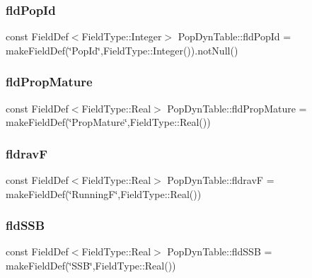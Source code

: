 \subsubsection{\texorpdfstring{fldPopId}{fldPopId}}
{\footnotesize\ttfamily const Field\+Def$<$Field\+Type\+::\+Integer$>$ Pop\+Dyn\+Table\+::fld\+Pop\+Id = make\+Field\+Def(\char`\"{}Pop\+Id\char`\"{},Field\+Type\+::\+Integer()).not\+Null()}

\mbox{\label{class_pop_dyn_table_a72338a05a2e3d98b7ee92238ddbfdc67}} 
\subsubsection{\texorpdfstring{fldPropMature}{fldPropMature}}
{\footnotesize\ttfamily const Field\+Def$<$Field\+Type\+::\+Real$>$ Pop\+Dyn\+Table\+::fld\+Prop\+Mature = make\+Field\+Def(\char`\"{}Prop\+Mature\char`\"{},Field\+Type\+::\+Real())}

\mbox{\label{class_pop_dyn_table_a75abd6249f9a3d69609698e12cdf17f6}} 
\subsubsection{\texorpdfstring{fldravF}{fldravF}}
{\footnotesize\ttfamily const Field\+Def$<$Field\+Type\+::\+Real$>$ Pop\+Dyn\+Table\+::fldravF = make\+Field\+Def(\char`\"{}RunningF\char`\"{},Field\+Type\+::\+Real())}

\mbox{\label{class_pop_dyn_table_a3dc24fac681a019c8cd9ae57457691aa}} 
\subsubsection{\texorpdfstring{fldSSB}{fldSSB}}
{\footnotesize\ttfamily const Field\+Def$<$Field\+Type\+::\+Real$>$ Pop\+Dyn\+Table\+::fld\+S\+SB = make\+Field\+Def(\char`\"{}S\+SB\char`\"{},Field\+Type\+::\+Real())}

\mbox{\label{class_pop_dyn_table_a552686556395ac42a807469d61122283}} 
